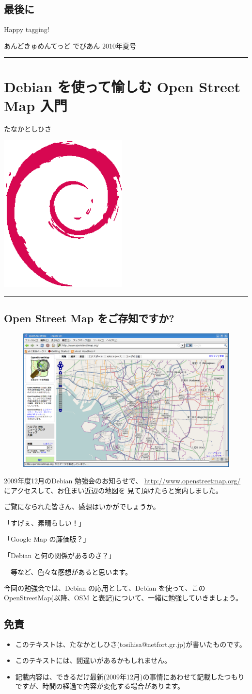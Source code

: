 \documentclass[mingoth,a4paper]{jsarticle}
\renewcommand{\dancersection}[2]{%
\newpage
あんどきゅめんてっど でびあん 2010年夏号
%
\vspace{0.1mm}\\
{\color{dancerlightblue}\rule{\hsize}{2mm}}

%
%
\begin{minipage}[t]{0.6\hsize}
\color{dancerdarkblue}
\vspace{1cm}
\section{#1}
\hfill{}#2\\
\end{minipage}
\begin{minipage}[t]{0.4\hsize}
\vspace{-2cm}
\hfill{}\includegraphics[height=8cm]{image200502/openlogo-nd.eps}\\
\vspace{-5cm}
\end{minipage}
%
%
{\color{dancerdarkblue}\rule{0.74\hsize}{2mm}}
%
\vspace{2cm}
}
\begin{document}
\subsection{最後に}
Happy tagging!

\dancersection{Debian を使って愉しむ Open Street Map 入門}{たなかとしひさ}

\subsection{Open Street Map をご存知ですか?}

\begin{figure}[h!]
    \centering
    \includegraphics[scale=0.3]{image200912/debianosm1.png}
    \label{fig:debianosm1}
\end{figure}

2009年度12月のDebian 勉強会のお知らせで、
\url{http://www.openstreetmap.org/} にアクセスして、お住まい近辺の地図を
見て頂けたらと案内しました。

ご覧になられた皆さん、感想はいかがでしょうか。

「すげぇ、素晴らしい！」

「Google Map の廉価版？」

「Debian と何の関係があるのさ？」

　等など、色々な感想があると思います。

今回の勉強会では、Debian の応用として、Debian を使って、この
OpenStreetMap(以降、OSM と表記)について、一緒に勉強していきましょう。

\subsection{免責}
\begin{itemize}
 \item このテキストは、たなかとしひさ(tosihisa@netfort.gr.jp)が書いたものです。
 \item このテキストには、間違いがあるかもしれません。
 \item 記載内容は、できるだけ最新(2009年12月)の事情にあわせて記載したつもりですが、時間の経過で内容が変化する場合があります。
\end{itemize}
\end{document}
